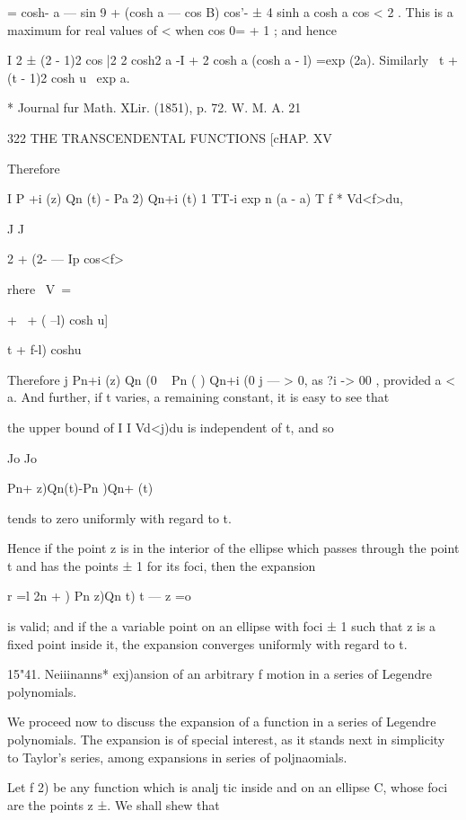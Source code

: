 {{{= cosh- a — sin 9 + (cosh a — cos B) cos'- ± 4 sinh a cosh a cos < 2 .
This is a maximum for real values of < when cos 0= + 1 ; and hence

I 2 ± (2 - 1)2 cos |2 2 cosh2 a -I + 2 cosh a (cosh a - l) =exp (2a).
Similarly \ t + (t - 1)2 cosh u \ exp a.

* Journal fur Math. XLir. (1851), p. 72. W. M. A. 21



322 THE TRANSCENDENTAL FUNCTIONS [cHAP. XV

Therefore

I P +i (z) Qn (t) - Pa 2) Qn+i (t) 1 TT-i exp n (a - a) T f * Vd<f>du,

J J

2 + (2- — Ip cos<f>



rhere \ V\ =



+ \ + ( --l) cosh u]



t + f-l) coshu

Therefore j Pn+i (z) Qn (0 ~ Pn ( ) Qn+i (0 j — > 0, as ?i -> 00 ,
provided a < a. And further, if t varies, a remaining constant, it is
easy to see that

the upper bound of I I Vd<j)du is independent of t, and so

Jo Jo

Pn+ z)Qn(t)-Pn )Qn+ (t)

tends to zero uniformly with regard to t.

Hence if the point z is in the interior of the ellipse which passes
through the point t and has the points ± 1 for its foci, then the
expansion

r =l 2n + ) Pn z)Qn t) t — z =o

is valid; and if the a variable point on an ellipse with foci ± 1 such
that z is a fixed point inside it, the expansion converges uniformly
with regard to t.

15"41. Neiiinanns* exj)ansion of an arbitrary f motion in a series of
Legendre polynomials.

We proceed now to discuss the expansion of a function in a series of
Legendre polynomials. The expansion is of special interest, as it
stands next in simplicity to Taylor's series, among expansions in
series of poljnaomials.

Let f 2) be any function which is analj tic inside and on an ellipse
C, whose foci are the points z ±. We shall shew that

}}}

